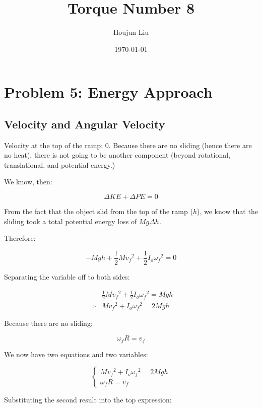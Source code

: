 \documentclass[letterpaper]{article}
\author{Houjun Liu}
\date{\today}
\title{Torque Number 8}
\renewcommand{\tableofcontents}{}
\begin{document}
\tableofcontents


\section{Problem 5: Energy Approach}
\label{sec:orgc636056}

\subsection{Velocity and Angular Velocity}
\label{sec:orgd99673e}
Velocity at the top of the ramp: \(0\). Because there are no sliding (hence there are no heat), there is not going to be another component (beyond rotational, translational, and potential energy.)

We know, then:

\begin{equation}
   \Delta KE +\Delta PE = 0 
\end{equation}

From the fact that the object slid from the top of the ramp (\(h\)), we know that the sliding took a total potential energy loss of \(Mg\Delta h\). 

Therefore:

\begin{equation}
   -Mgh + \frac{1}{2} M{v_f}^2 + \frac{1}{2}I_o {\omega_f}^2 = 0
\end{equation}

Separating the variable off to both sides:

\begin{align}
    &\frac{1}{2} M{v_f}^2 + \frac{1}{2}I_o {\omega_f}^2 = Mgh\\
\Rightarrow & M{v_f}^2 + I_o {\omega_f}^2 = 2 Mgh
\end{align}

Because there are no sliding:

\begin{equation}
   {\omega_f} R = v_f
\end{equation}

We now have two equations and two variables:

\begin{equation}
   \begin{cases}
    M{v_f}^2 + I_o {\omega_f}^2 = 2 Mgh\\
   {\omega_f} R = v_f
\end{cases}
\end{equation}

Substituting the second result into the top expression:
\end{document}
